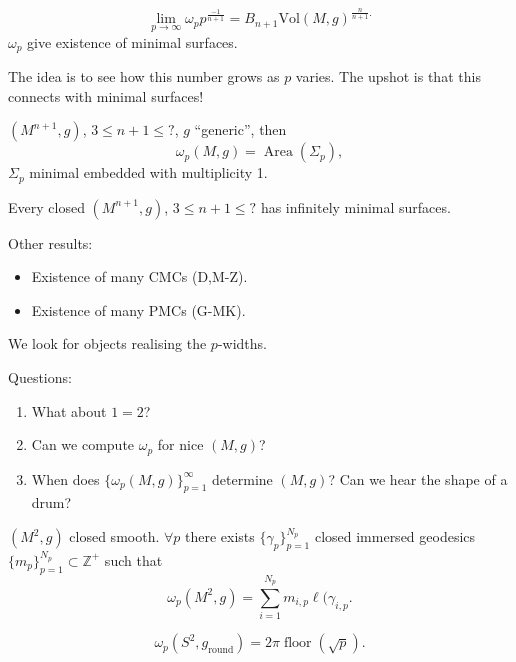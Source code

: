 \begin{theorem}[GGLMN]
\label{theorem-gglm}
$$
\lim_{p \to \infty}\omega_p
p^{\frac{-1}{n+1}}
=B_{n+1}\text{Vol}(M,g)^{\frac{n}{n+1}.}
$$
$\omega_p$ give existence of minimal surfaces.

\end{theorem}

\noindent
The idea is to see how this number
grows as $p$ varies.
The upshot is that this connects
with minimal surfaces!

\begin{theorem}[M-Neves-Z]
\label{theorem-mnz}
$(M^{n+1},g)$, $3 \leq  n+1 \leq  ?$,
$g$ ``generic'', then
$$
\omega_p(M,g)
=\operatorname{Area}(\Sigma_p),
$$
$\Sigma_p$ minimal embedded with multiplicity
1.
\end{theorem}

\begin{corollary}
\label{lemma-yau-conjecture-minimal-surfaces}
Every closed $(M^{n+1},g)$,
$3 \leq  n+1 \leq ?$
has infinitely minimal surfaces.
\end{corollary}

\noindent
Other results:
\begin{itemize}
\item Existence of many CMCs (D,M-Z).
\item Existence of many PMCs (G-MK).
\end{itemize}

\noindent
We look for objects realising the $p$-widths.

\noindent
Questions:
\begin{enumerate}
\item What about $1=2$?
\item Can we compute $\omega_p$ for nice
$(M,g)$?
\item When does $\{\omega_p(M,g)\}_{p=1}^\infty$
determine $(M,g)$?
Can we hear the shape of a drum?
\end{enumerate}

\begin{theorem}[C-M]
\label{theorem-cm1}
$(M^2,g)$
closed smooth. $\forall  p$ there exists
$\{\gamma_p\}_{p=1}^{N_p}$
closed immersed geodesics
$\{m_p\}_{p=1}^{N_p}\subset \mathbb{Z}^+$
such that
$$
\omega_p(M^2,g)
=\sum_{i=1}^{N_p}m_{i,p}\ell(\gamma_{i,p}.
$$
\end{theorem}

\begin{theorem}[C-M]
\label{theorem-cm2}
$$
\omega_p(S^2,g_{\operatorname{round}})
=2\pi \operatorname{floor}(\sqrt{p}).
$$
\end{theorem}

